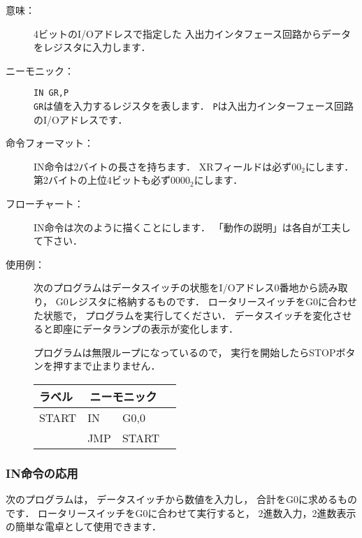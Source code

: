 \begin{description}
\item[意味：]4ビットのI/Oアドレスで指定した
  入出力インタフェース回路からデータをレジスタに入力します．

\item[ニーモニック：]\texttt{IN  GR,P} \\
  \texttt{GR}は値を入力するレジスタを表します．
  \texttt{P}は入出力インターフェース回路のI/Oアドレスです．

\item[命令フォーマット：]IN命令は2バイトの長さを持ちます．
  XRフィールドは必ず$00_2$にします．
  第2バイトの上位4ビットも必ず$0000_2$にします．


\item[フローチャート：]IN命令は次のように描くことにします．
  「動作の説明」は各自が工夫して下さい．

  \begin{center}
  \end{center}

\item[使用例：]
  次のプログラムはデータスイッチの状態をI/Oアドレス0番地から読み取り，
  G0レジスタに格納するものです．
  ロータリースイッチをG0に合わせた状態で，
  プログラムを実行してください．
  データスイッチを変化させると即座にデータランプの表示が変化します．

  プログラムは無限ループになっているので，
  実行を開始したらSTOPボタンを押すまで止まりません．

  {\ttfamily\small\begin{center}
    \begin{tabular}{|l|l l|l}
      \cline{1-3}
      ラベル & \multicolumn{2}{|c|}{ニーモニック} \\
      \hline
      START & IN   & G0,0    \\
      & JMP  & START   \\ 
      \hline
    \end{tabular}
  \end{center}}

\end{description}

\subsubsection{IN命令の応用}
次のプログラムは，
データスイッチから数値を入力し，
合計をG0に求めるものです．
ロータリースイッチをG0に合わせて実行すると，
2進数入力，2進数表示の簡単な電卓として使用できます．

